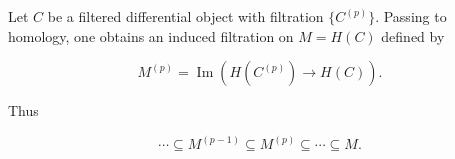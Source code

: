 Let $C$ be a filtered differential object with filtration $\{C^{(p)}\}$. Passing to homology, one obtains an induced filtration on $M = H(C)$ defined by

$$M^{(p)} = \operatorname{Im}\left( H(C^{(p)}) \rightarrow H(C) \right).$$

Thus

$$\cdots \subseteq M^{(p-1)} \subseteq M^{(p)} \subseteq \cdots \subseteq M.$$
